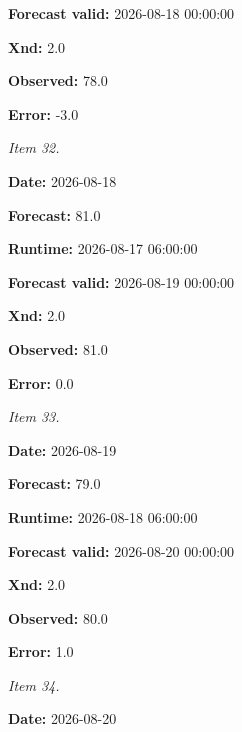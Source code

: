 \documentclass[11pt]{article}
\begin{document}
\par\noindent\textbf{Forecast valid:} 2026-08-18 00:00:00

\par\noindent\textbf{Xnd:} 2.0

\par\noindent\textbf{Observed:} 78.0

\par\noindent\textbf{Error:} -3.0

\par\noindent\textit{Item 32.}\par \par\noindent\textbf{Date:} 2026-08-18

\par\noindent\textbf{Forecast:} 81.0

\par\noindent\textbf{Runtime:} 2026-08-17 06:00:00

\par\noindent\textbf{Forecast valid:} 2026-08-19 00:00:00

\par\noindent\textbf{Xnd:} 2.0

\par\noindent\textbf{Observed:} 81.0

\par\noindent\textbf{Error:} 0.0

\par\noindent\textit{Item 33.}\par \par\noindent\textbf{Date:} 2026-08-19

\par\noindent\textbf{Forecast:} 79.0

\par\noindent\textbf{Runtime:} 2026-08-18 06:00:00

\par\noindent\textbf{Forecast valid:} 2026-08-20 00:00:00

\par\noindent\textbf{Xnd:} 2.0

\par\noindent\textbf{Observed:} 80.0

\par\noindent\textbf{Error:} 1.0

\par\noindent\textit{Item 34.}\par \par\noindent\textbf{Date:} 2026-08-20
\end{document}

